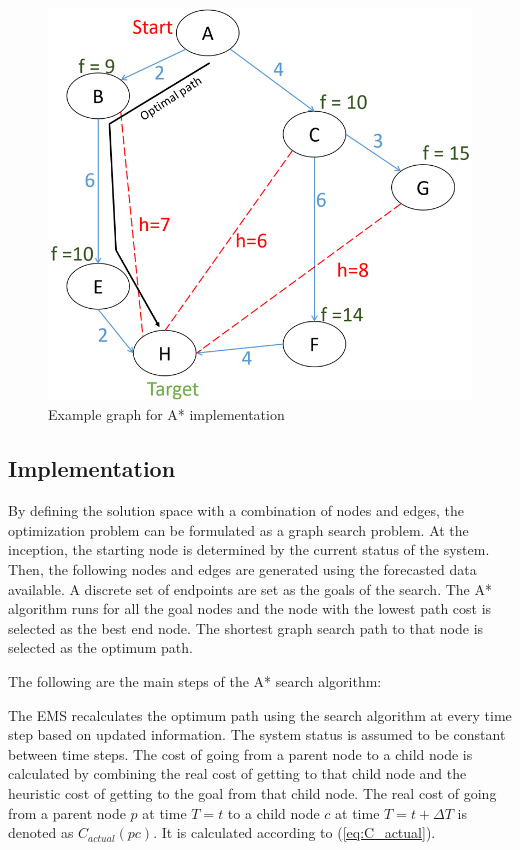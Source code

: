 \begin{figure}[!ht]
\centering
\includegraphics[width=\linewidth]{figs/A_STAR_PIC.png}
\caption{Example graph for A* implementation}
\label{fig:A_STAR_PIC}
\end{figure}

\subsection{Implementation}
By defining the solution space with a combination of nodes and edges, the optimization problem can be formulated as a graph search problem. At the inception, the starting node is determined by the current status of the system. Then, the following nodes and edges are generated using the forecasted data available. A discrete set of endpoints are set as the goals of the search. The A*  algorithm runs for all the goal nodes and the node with the lowest path cost is selected as the best end node. The shortest graph search path to that node is selected as the optimum path.

The following are the main steps of the A* search algorithm:


The EMS recalculates the optimum path using the search algorithm at every time step based on updated information. The system status is assumed to be constant between time steps. The cost of going from a parent node to a child node is calculated by combining the real cost of getting to that child node and the heuristic cost of getting to the goal from that child node. The real cost of going from a parent node $p$ at time $T=t$ to a child node $c$ at time $T=t+\Delta T$ is denoted as $C_{actual}(pc)$. It is calculated according to (\ref{eq:C_actual}).

